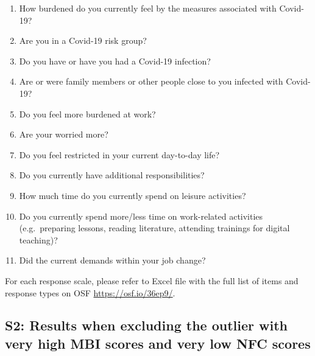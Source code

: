 \documentclass[
  english,
  man,floatsintext]{apa6}
\begin{document}
\begin{enumerate}
\def\labelenumi{\arabic{enumi}.}
\item
  How burdened do you currently feel by the measures associated with Covid-19?
\item
  Are you in a Covid-19 risk group?
\item
  Do you have or have you had a Covid-19 infection?
\item
  Are or were family members or other people close to you infected with Covid-19?
\item
  Do you feel more burdened at work?
\item
  Are your worried more?
\item
  Do you feel restricted in your current day-to-day life?
\item
  Do you currently have additional responsibilities?
\item
  How much time do you currently spend on leisure activities?
\item
  Do you currently spend more/less time on work-related activities (e.g.~preparing lessons, reading literature, attending trainings for digital teaching)?
\item
  Did the current demands within your job change?
\end{enumerate}

For each response scale, please refer to Excel file with the full list of items and response types on OSF \url{https://osf.io/36ep9/}.

\newpage
{}
\setcounter{section}{19}
\setcounter{figure}{0}
\setcounter{table}{0}

\hypertarget{s2-results-when-excluding-the-outlier-with-very-high-mbi-scores-and-very-low-nfc-scores}{%
\subsection{S2: Results when excluding the outlier with very high MBI scores and very low NFC scores}\label{s2-results-when-excluding-the-outlier-with-very-high-mbi-scores-and-very-low-nfc-scores}}
\end{document}

